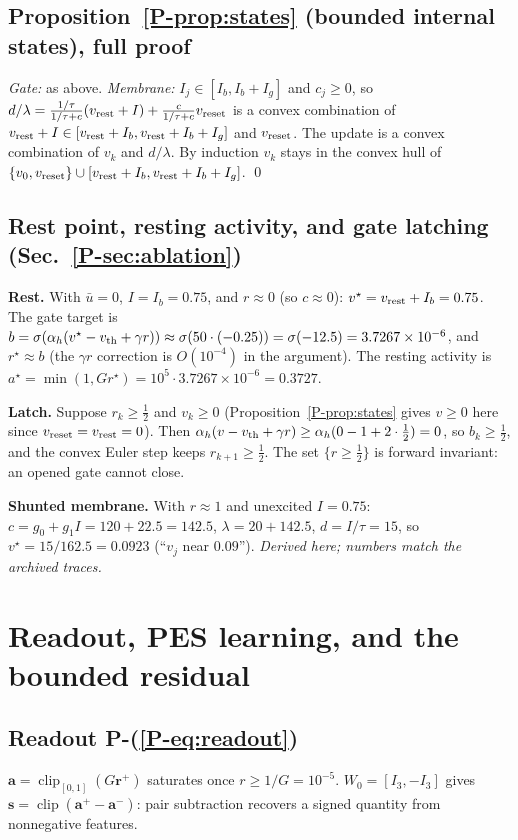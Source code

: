 \documentclass[11pt]{article}
\newcommand{\srcroot}{../../..}
\newcommand{\clip}{\operatorname{clip}}
\newcommand{\PE}[1]{P-(\ref{P-#1})}          %
\newcommand{\PT}[1]{\ref{P-#1}}               %
\newcommand{\code}[1]{\texttt{\detokenize{#1}}}
\theoremstyle{remark}
\newcommand{\listing}[4]{%
  }
\begin{document}
\subsection{Proposition~\PT{prop:states} (bounded internal states), full proof}
\emph{Gate:} as above. \emph{Membrane:} $I_j\in[I_b,I_b+I_g]$ and $c_j\ge0$, so
$d/\lambda=\frac{1/\tau}{1/\tau+c}(v_{\rm rest}+I)+\frac{c}{1/\tau+c}v_{\rm reset}$ is a convex combination of
$v_{\rm rest}+I\in[v_{\rm rest}+I_b,v_{\rm rest}+I_b+I_g]$ and $v_{\rm reset}$. The update is a convex
combination of $v_k$ and $d/\lambda$. By induction $v_k$ stays in the convex hull of
$\{v_0,v_{\rm reset}\}\cup[v_{\rm rest}+I_b,v_{\rm rest}+I_b+I_g]$. \qed

\subsection{Rest point, resting activity, and gate latching (Sec.~\PT{sec:ablation})}
\textbf{Rest.} With $\bar u=0$, $I=I_b=0.75$, and $r\approx0$ (so $c\approx0$): $v^\star=v_{\rm rest}+I_b=0.75$.
The gate target is $b=\sigma(\alpha_h(v^\star-v_{\rm th}+\gamma r))\approx\sigma(50\cdot(-0.25))=\sigma(-12.5)
=3.7267\times10^{-6}$, and $r^\star\approx b$ (the $\gamma r$ correction is $O(10^{-4})$ in the argument).
The resting activity is $a^\star=\min(1,Gr^\star)=10^5\cdot3.7267\times10^{-6}=0.3727$.

\textbf{Latch.} Suppose $r_k\ge\frac12$ and $v_k\ge0$ (Proposition~\PT{prop:states} gives $v\ge0$ here since
$v_{\rm reset}=v_{\rm rest}=0$). Then $\alpha_h(v-v_{\rm th}+\gamma r)\ge\alpha_h(0-1+2\cdot\tfrac12)=0$, so
$b_k\ge\frac12$, and the convex Euler step keeps $r_{k+1}\ge\frac12$. The set $\{r\ge\frac12\}$ is forward
invariant: an opened gate cannot close.

\textbf{Shunted membrane.} With $r\approx1$ and unexcited $I=0.75$:
$c=g_0+g_1I=120+22.5=142.5$, $\lambda=20+142.5$, $d=I/\tau=15$, so $v^\star=15/162.5=0.0923$
(``$v_j$ near $0.09$''). \emph{Derived here; numbers match the archived traces.}

\section{Readout, PES learning, and the bounded residual}
\subsection{Readout \PE{eq:readout}}
$\bm a=\clip_{[0,1]}(G\bm r^+)$ saturates once $r\ge1/G=10^{-5}$. $W_0=[I_3,-I_3]$ gives
$\bm s=\clip(\bm a^+-\bm a^-)$: pair subtraction recovers a signed quantity from nonnegative features.
\listing{src/gra_control/gate.py}{104}{134}{direct augmentor: encoding, readout, PES, residual}
\end{document}

